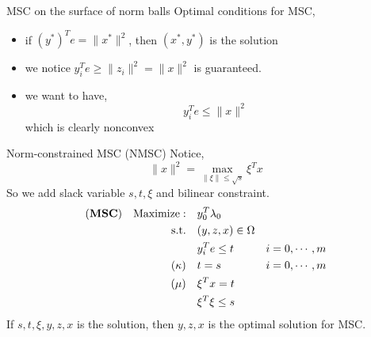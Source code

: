 \begin{frame}{MSC on the surface of norm balls}
  Optimal conditions for MSC,
  \begin{itemize}
    \item if \((y^*)^Te = \|x^*\|^2\), then \((x^*, y^*)\) is the solution
    \item we notice \(y_i^Te \ge \|z_i\|^2 = \|x\|^2 \) is guaranteed.
    \item we want to have,
          \[y_i^Te \le \|x\|^2\]
          which is clearly nonconvex
  \end{itemize}
\end{frame}
\begin{frame}{Norm-constrained MSC (NMSC)}
  Notice,
  \begin{equation}
    \|x\|^2 = \max_{\|\xi\| \le \sqrt s} \xi^T x
  \end{equation}
  So we add slack variable \(s, t, \xi\) and bilinear constraint.
  \begin{align}
    (\textbf{MSC}) \quad \mathrm{Maximize: }\quad & y_0 ^T\lambda_0                     \\
    \mathrm{s.t.} \quad                        & (y,z,x) \in \Omega                  \\
                                               & y_i^Te \le t       & i=0, \cdots, m \\
    (\kappa) \quad                             & t= s               & i=0, \cdots, m \\
    (\mu)    \quad                             & \xi^Tx = t                          \\
                                               & \xi^T\xi \le s
  \end{align}
  If \(s, t, \xi, y, z, x\) is the solution, then \( y, z, x\) is the optimal solution for MSC.
\end{frame}

